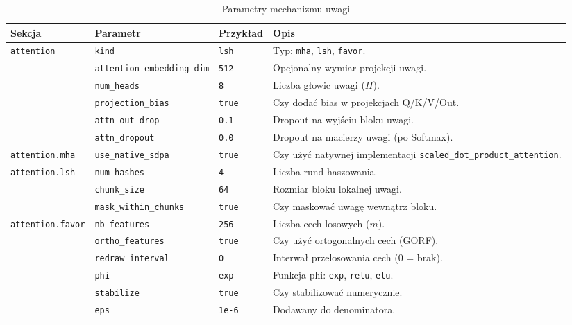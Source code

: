 \documentclass[a4paper,11pt,twoside]{report}
\theoremstyle{definition}
\begin{document}
\begin{table}[h!]
\centering
\caption{Parametry mechanizmu uwagi}
\label{tab:params_attention}
\small
\smallskip
\begin{tabularx}{\textwidth}{@{}lllX@{}}
\toprule
\textbf{Sekcja} & \textbf{Parametr} & \textbf{Przykład} & \textbf{Opis} \\
\midrule
\texttt{attention} 
    & \texttt{kind} & \texttt{lsh} & Typ: \texttt{mha}, \texttt{lsh}, \texttt{favor}. \\
    & \texttt{attention\_embedding\_dim} & \texttt{512} & Opcjonalny wymiar projekcji uwagi. \\
    & \texttt{num\_heads} & \texttt{8} & Liczba głowic uwagi ($H$). \\
    & \texttt{projection\_bias} & \texttt{true} & Czy dodać bias w projekcjach Q/K/V/Out. \\
    & \texttt{attn\_out\_drop} & \texttt{0.1} & Dropout na wyjściu bloku uwagi. \\
    & \texttt{attn\_dropout} & \texttt{0.0} & Dropout na macierzy uwagi (po Softmax). \\
\midrule
\texttt{attention.mha} 
    & \texttt{use\_native\_sdpa} & \texttt{true} & Czy użyć natywnej implementacji \texttt{scaled\_dot\_product\_attention}. \\
\midrule
\texttt{attention.lsh} 
    & \texttt{num\_hashes} & \texttt{4} & Liczba rund haszowania. \\
    & \texttt{chunk\_size} & \texttt{64} & Rozmiar bloku lokalnej uwagi. \\
    & \texttt{mask\_within\_chunks} & \texttt{true} & Czy maskować uwagę wewnątrz bloku. \\
\midrule
\texttt{attention.favor} 
    & \texttt{nb\_features} & \texttt{256} & Liczba cech losowych ($m$). \\
    & \texttt{ortho\_features} & \texttt{true} & Czy użyć ortogonalnych cech (GORF). \\
    & \texttt{redraw\_interval} & \texttt{0} & Interwał przelosowania cech (0 = brak). \\
    & \texttt{phi} & \texttt{exp} & Funkcja phi: \texttt{exp}, \texttt{relu}, \texttt{elu}. \\
    & \texttt{stabilize} & \texttt{true} & Czy stabilizować numerycznie. \\
    & \texttt{eps} & \texttt{1e-6} & Dodawany do denominatora. \\
\bottomrule
\end{tabularx}
\end{table}
\end{document}
